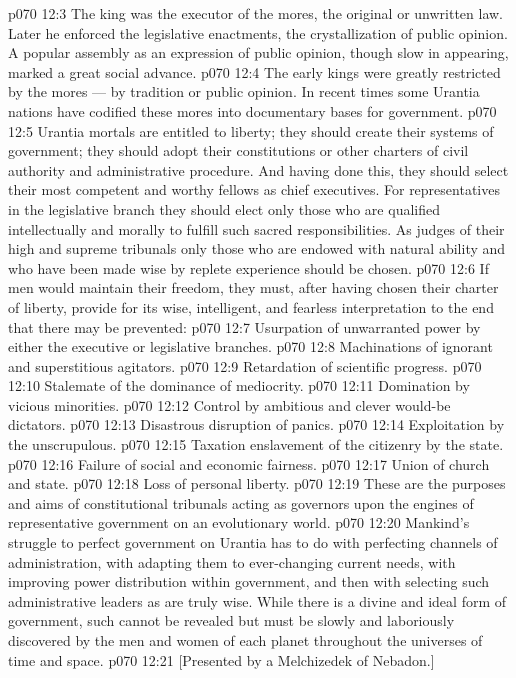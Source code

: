 \vs p070 12:3 The king was the executor of the mores, the original or unwritten law. Later he enforced the legislative enactments, the crystallization of public opinion. A popular assembly as an expression of public opinion, though slow in appearing, marked a great social advance.
\vs p070 12:4 The early kings were greatly restricted by the mores --- by tradition or public opinion. In recent times some Urantia nations have codified these mores into documentary bases for government.
\vs p070 12:5 \pc Urantia mortals are entitled to liberty; they should create their systems of government; they should adopt their constitutions or other charters of civil authority and administrative procedure. And having done this, they should select their most competent and worthy fellows as chief executives. For representatives in the legislative branch they should elect only those who are qualified intellectually and morally to fulfill such sacred responsibilities. As judges of their high and supreme tribunals only those who are endowed with natural ability and who have been made wise by replete experience should be chosen.
\vs p070 12:6 If men would maintain their freedom, they must, after having chosen their charter of liberty, provide for its wise, intelligent, and fearless interpretation to the end that there may be prevented:
\vs p070 12:7 \bibnobreakspace Usurpation of unwarranted power by either the executive or legislative branches.
\vs p070 12:8 \bibnobreakspace Machinations of ignorant and superstitious agitators.
\vs p070 12:9 \bibnobreakspace Retardation of scientific progress.
\vs p070 12:10 \bibnobreakspace Stalemate of the dominance of mediocrity.
\vs p070 12:11 \bibnobreakspace Domination by vicious minorities.
\vs p070 12:12 \bibnobreakspace Control by ambitious and clever would\hyp{}be dictators.
\vs p070 12:13 \bibnobreakspace Disastrous disruption of panics.
\vs p070 12:14 \bibnobreakspace Exploitation by the unscrupulous.
\vs p070 12:15 \bibnobreakspace Taxation enslavement of the citizenry by the state.
\vs p070 12:16 \bibnobreakspace Failure of social and economic fairness.
\vs p070 12:17 \bibnobreakspace Union of church and state.
\vs p070 12:18 \bibnobreakspace Loss of personal liberty.
\vs p070 12:19 \pc These are the purposes and aims of constitutional tribunals acting as governors upon the engines of representative government on an evolutionary world.
\vs p070 12:20 Mankind’s struggle to perfect government on Urantia has to do with perfecting channels of administration, with adapting them to ever\hyp{}changing current needs, with improving power distribution within government, and then with selecting such administrative leaders as are truly wise. While there is a divine and ideal form of government, such cannot be revealed but must be slowly and laboriously discovered by the men and women of each planet throughout the universes of time and space.
\vsetoff
\vs p070 12:21 [Presented by a Melchizedek of Nebadon.]
